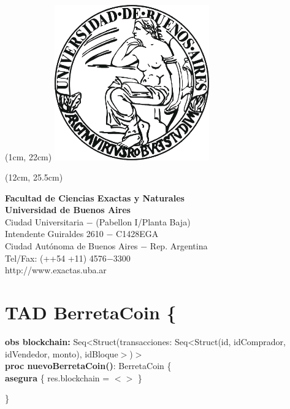 \documentclass{article}
\begin{document}
\begin{textblock*}{17cm} (1cm, 22cm)
    {
    \includegraphics[width=0.5\textwidth]{uba_logo.jpg}
    }
\end{textblock*}

\begin{textblock*}{20cm} (12cm, 25.5cm)
    {\raggedright\textbf{Facultad de Ciencias Exactas y Naturales}\\
    \textbf{Universidad de Buenos Aires}\\
    Ciudad Universitaria $-$ (Pabellon I/Planta Baja)\\
    Intendente Guiraldes 2610 $-$ C1428EGA\\
    Ciudad Autónoma de Buenos Aires $-$ Rep. Argentina\\
    Tel/Fax: (++54 +11) 4576$-$3300\\
    http://www.exactas.uba.ar
    }
\end{textblock*}



\newpage
\setcounter{page}{1}
\section*{TAD \textdollar BerretaCoin \{}
    \textbf{obs blockchain:} Seq\textless Struct(transacciones: Seq\textless Struct(id, idComprador,
                             idVendedor, monto), idBloque$>$)$>$\\

    \textbf{proc nuevoBerretaCoin()}: BerretaCoin \{\\
        \indent\indent \textbf{asegura} \{ res.blockchain = $<>$ \}

    \}\\\\
\end{document}
